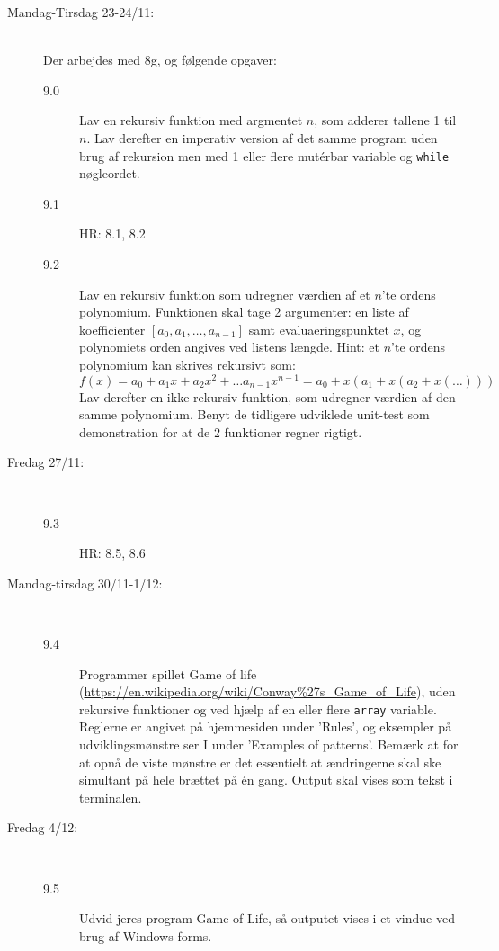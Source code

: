 \documentclass[a4paper,12pt]{article}
\begin{document}
\begin{description}
\item[Mandag-Tirsdag 23-24/11:]~\\[0cm]
  Der arbejdes med 8g, og følgende opgaver:
  \begin{description}
  \item[9.0] Lav en rekursiv funktion med argmentet $n$, som adderer
    tallene 1 til $n$. Lav derefter en imperativ version af det samme
    program uden brug af rekursion men med 1 eller flere mut\'{e}rbar
    variable og \lstinline|while| nøgleordet.
  \item[9.1] HR: 8.1, 8.2
  \item[9.2] Lav en rekursiv funktion som udregner værdien af et
    $n$'te ordens polynomium. Funktionen skal tage 2 argumenter: en
    liste af koefficienter $[a_0, a_1, \dots, a_{n-1}]$
    samt evaluaeringspunktet $x$, og polynomiets orden angives ved
    listens længde. Hint: et $n$'te ordens polynomium kan skrives
    rekursivt som:
    \begin{equation}
      f(x) = a_0+ a_1 x + a_2x^2+\dots a_{n-1}x^{n-1} = a_0 +
      x\left(a_1 + x\left(a_2 + x\left(\dots\right)\right)\right)
    \end{equation}
    Lav derefter en ikke-rekursiv funktion, som udregner værdien af
    den samme polynomium. Benyt de tidligere udviklede unit-test som
    demonstration for at de 2 funktioner regner rigtigt.
  \end{description}
\item[Fredag 27/11:]~\\[-5mm]
  \begin{description}
  \item[9.3] HR: 8.5, 8.6
  \end{description}
\item[Mandag-tirsdag 30/11-1/12:]~\\[-5mm]
   \begin{description}
  \item[9.4] Programmer spillet Game of life
    (\url{https://en.wikipedia.org/wiki/Conway%27s_Game_of_Life}),
    uden rekursive funktioner og ved hjælp af en eller flere
    \lstinline|array| variable. Reglerne er angivet på hjemmesiden
    under 'Rules', og eksempler på udviklingsmønstre ser I under
    'Examples of patterns'. Bemærk at for at opnå de viste mønstre er
    det essentielt at ændringerne skal ske simultant på hele brættet
    på \'{e}n gang. Output skal vises som tekst i terminalen.
  \end{description}
\item[Fredag 4/12:]~\\[-5mm]
  \begin{description}
  \item[9.5] Udvid jeres program Game of Life, så outputet vises i et
    vindue ved brug af Windows forms.
  \end{description}
\end{description}
\end{document}
